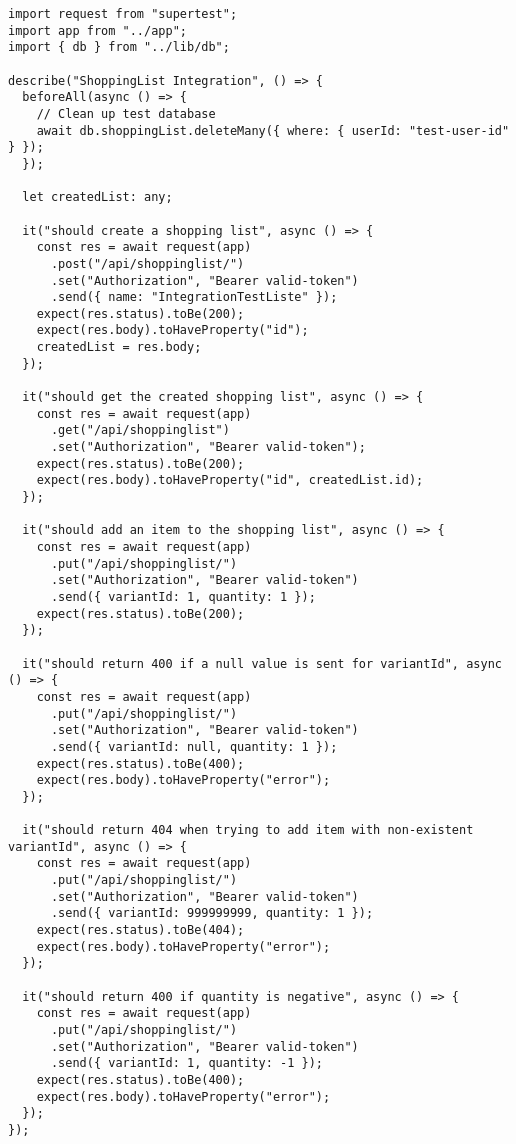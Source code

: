 \begin{lstlisting}[style=typescriptstyle,caption={Shopping List Integration Tests}]
import request from "supertest";
import app from "../app";
import { db } from "../lib/db";

describe("ShoppingList Integration", () => {
  beforeAll(async () => {
    // Clean up test database
    await db.shoppingList.deleteMany({ where: { userId: "test-user-id" } });
  });

  let createdList: any;

  it("should create a shopping list", async () => {
    const res = await request(app)
      .post("/api/shoppinglist/")
      .set("Authorization", "Bearer valid-token")
      .send({ name: "IntegrationTestListe" });
    expect(res.status).toBe(200);
    expect(res.body).toHaveProperty("id");
    createdList = res.body;
  });

  it("should get the created shopping list", async () => {
    const res = await request(app)
      .get("/api/shoppinglist")
      .set("Authorization", "Bearer valid-token");
    expect(res.status).toBe(200);
    expect(res.body).toHaveProperty("id", createdList.id);
  });
  
  it("should add an item to the shopping list", async () => {
    const res = await request(app)
      .put("/api/shoppinglist/")
      .set("Authorization", "Bearer valid-token")
      .send({ variantId: 1, quantity: 1 });
    expect(res.status).toBe(200);
  });

  it("should return 400 if a null value is sent for variantId", async () => {
    const res = await request(app)
      .put("/api/shoppinglist/")
      .set("Authorization", "Bearer valid-token")
      .send({ variantId: null, quantity: 1 });
    expect(res.status).toBe(400);
    expect(res.body).toHaveProperty("error");
  });

  it("should return 404 when trying to add item with non-existent variantId", async () => {
    const res = await request(app)
      .put("/api/shoppinglist/")
      .set("Authorization", "Bearer valid-token")
      .send({ variantId: 999999999, quantity: 1 });
    expect(res.status).toBe(404);
    expect(res.body).toHaveProperty("error");
  });

  it("should return 400 if quantity is negative", async () => {
    const res = await request(app)
      .put("/api/shoppinglist/")
      .set("Authorization", "Bearer valid-token")
      .send({ variantId: 1, quantity: -1 });
    expect(res.status).toBe(400);
    expect(res.body).toHaveProperty("error");
  });
});
\end{lstlisting}

